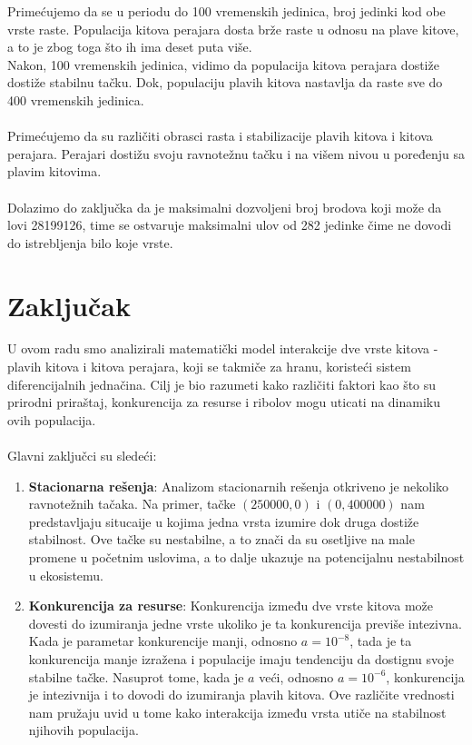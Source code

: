 \documentclass[a4paper]{article}
\begin{document}
{	
	Primećujemo da se u periodu do 100 vremenskih jedinica, broj jedinki kod obe vrste raste. Populacija kitova perajara dosta brže raste u odnosu na plave kitove, a to je zbog toga što ih ima deset puta više. \\
	Nakon, 100 vremenskih jedinica, vidimo da populacija kitova perajara dostiže dostiže stabilnu tačku. Dok, populaciju plavih kitova nastavlja da raste sve do 400 vremenskih jedinica. \\
	\\
	Primećujemo da su različiti obrasci rasta i stabilizacije plavih kitova i kitova perajara. Perajari dostižu svoju ravnotežnu tačku i na višem nivou u poređenju sa plavim kitovima.\\
	\\
	Dolazimo do zaključka da je maksimalni dozvoljeni broj brodova koji može da lovi 28199126, time se ostvaruje maksimalni ulov od 282 jedinke čime ne dovodi do istrebljenja bilo koje vrste.
	\fi
	
	\newpage
	
	\section{Zaključak}
	\label{sec: zakljucak}
	
	U ovom radu smo analizirali matematički model interakcije dve vrste kitova - plavih kitova i kitova perajara, koji se takmiče za hranu, koristeći sistem diferencijalnih jednačina. Cilj je bio razumeti kako različiti faktori kao što su prirodni priraštaj, konkurencija za resurse i ribolov mogu uticati na dinamiku ovih populacija. \\
	\\
	Glavni zaključci su sledeći: \\ 
	
	\begin{enumerate}
		
		\item \textbf{Stacionarna rešenja}: Analizom stacionarnih rešenja otkriveno je nekoliko ravnotežnih tačaka. Na primer, tačke $(250000, 0)$ i $(0, 400000)$ nam predstavljaju situcaije u kojima jedna vrsta izumire dok druga dostiže stabilnost. Ove tačke su nestabilne, a to znači da su osetljive na male promene u početnim uslovima, a to dalje ukazuje na potencijalnu nestabilnost u ekosistemu.
		
		\item \textbf{Konkurencija za resurse}: Konkurencija između dve vrste kitova može dovesti do izumiranja jedne vrste ukoliko je ta konkurencija previše intezivna. Kada je parametar konkurencije manji, odnosno $a = 10^{-8}$, tada je ta konkurencija manje izražena i populacije imaju tendenciju da dostignu svoje stabilne tačke. Nasuprot tome, kada je $a$ veći, odnosno $a = 10^{-6}$, konkurencija je intezivnija i to dovodi do izumiranja plavih kitova. Ove različite vrednosti nam pružaju uvid u tome kako interakcija između vrsta utiče na stabilnost njihovih populacija. 
		

\end{enumerate}}
\end{document}
